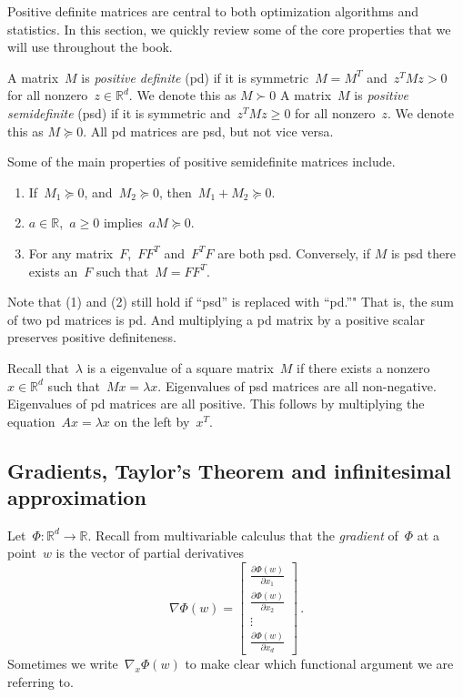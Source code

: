 \documentclass{tufte-book}
\begin{document}
Positive definite matrices are central to both optimization algorithms
and statistics. In this section, we quickly review some of the core
properties that we will use throughout the book.

A matrix~\(M\) is \emph{positive definite} (pd) if it is
symmetric~\(M = M^T\) and~\(z^T M z > 0\) for all
nonzero~\(z\in \mathbb{R}^d\). We denote this as \(M \succ 0\) A
matrix~\(M\) is \emph{positive semidefinite} (psd) if it is symmetric
and~\(z^T M z \geq 0\) for all nonzero~\(z\). We denote this as
\(M \succeq 0\). All pd matrices are psd, but not vice versa.

Some of the main properties of positive semidefinite matrices include.

\begin{enumerate}
\def\labelenumi{\arabic{enumi}.}
\item
  If~\(M_1 \succeq 0\), and~\(M_2 \succeq 0\),
  then~\(M_1 + M_2 \succeq 0\).
\item
  \(a \in \mathbb{R}\),~\(a\geq 0\) implies~\(aM \succeq 0\).
\item
  For any matrix~\(F\),~\(FF^T\) and~\(F^TF\) are both psd. Conversely,
  if \(M\) is psd there exists an~\(F\) such that~\(M = FF^T\).
\end{enumerate}

Note that (1) and (2) still hold if ``psd'' is replaced with ``pd.''"
That is, the sum of two pd matrices is pd. And multiplying a pd matrix
by a positive scalar preserves positive definiteness.

Recall that~\(\lambda\) is a eigenvalue of a square matrix~\(M\) if
there exists a nonzero~\(x\in \mathbb{R}^d\) such
that~\(Mx = \lambda x\). Eigenvalues of psd matrices are all
non-negative. Eigenvalues of pd matrices are all positive. This follows
by multiplying the equation~\(Ax = \lambda x\) on the left by~\(x^T\).

\hypertarget{gradients-taylors-theorem-and-infinitesimal-approximation}{%
\subsection{Gradients, Taylor's Theorem and infinitesimal
approximation}\label{gradients-taylors-theorem-and-infinitesimal-approximation}}

Let~\(\Phi:\mathbb{R}^d\rightarrow \mathbb{R}\). Recall from
multivariable calculus that the \emph{gradient}
of~\(\Phi\) at a point~\(w\) is the vector of partial derivatives \[
    \nabla \Phi(w) = \begin{bmatrix} \frac{\partial \Phi(w)}{\partial x_1} \\ \frac{\partial \Phi(w)}{\partial x_2} \\ \vdots \\ \frac{\partial \Phi(w)}{\partial x_d} \end{bmatrix}\,.
\] Sometimes we write~\(\nabla_x\Phi(w)\) to make clear which functional
argument we are referring to.
\end{document}

